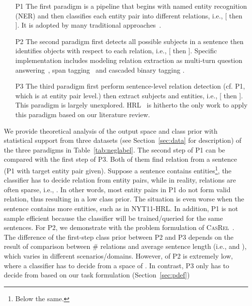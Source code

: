 \documentclass[11pt,a4paper]{article}
\begin{document}
\begin{itemize}
    \item[P1] The first paradigm is a pipeline that begins with named entity recognition (NER) and then classifies each entity pair into different relations, i.e., [ then ]. 
    It is adopted by many traditional approaches~\cite{mintz2009distant,chan2011exploiting,zeng2014relation,Zeng2015DistantSF,gormley2015improved,dos2015classifying,lin2016neural}. 
    \item[P2] The second paradigm first detects all possible subjects in a sentence then identifies objects with respect to each relation, i.e., [ then ]. Specific implementation includes modeling relation extraction as multi-turn question answering~\cite{Li2019EntityRelationEA}, span tagging~\cite{yu2020joint} and cascaded binary tagging \cite{Wei2020ANC}.
\item[P3] The third paradigm first perform sentence-level relation detection (cf. P1, which is at entity pair level.) then extract subjects and entities, i.e., [ then ].
    This paradigm is largely unexplored.
    HRL~\cite{Takanobu2019AHF} is hitherto the only work to apply this paradigm based on our literature review.
\end{itemize}
We provide theoretical analysis of the output space and class prior with statistical support from three datasets (see Section~\ref{sec:data} for description) of the three paradigms in Table~\ref{tab:neglabel}.
The second step of P1 can be compared with the first step of P3.
Both of them find relation from a sentence (P1 with target entity pair given).
Suppose a sentence contains  entities\footnote{Below the same.}, the classifier has to decide relation from  entity pairs, while in reality, relations are often sparse, i.e., . 
In other words, most entity pairs in P1 do not form valid relation, thus resulting in a low class prior.
The situation is even worse when the sentence contains more entities, such as in NYT11-HRL.
In addition, P1 is not sample efficient because the classifier will be trained/queried  for the same sentences.
For P2, we demonstrate with the problem formulation of \textsc{CasRel}~\cite{Wei2020ANC}.
The difference of the first-step class prior between P2 and P3 depends on the result of comparison between \# relations and average sentence length (i.e.,  and ), which varies in different scenarios/domains.
However,  of P2 is extremely low, where a classifier has to decide from a space of .
In contrast, P3 only has to decide from  based on our task formulation (Section~\ref{sec:pdef})
\end{document}
